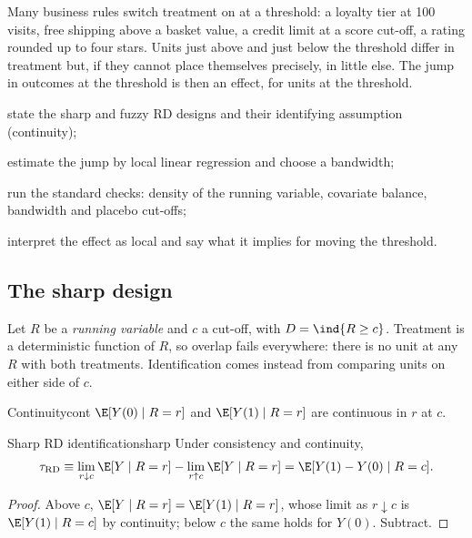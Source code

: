 \documentclass[11pt]{article}
\begin{document}

\begin{decision}
Many business rules switch treatment on at a threshold: a loyalty tier at 100 visits, free shipping above a basket value, a
credit limit at a score cut-off, a rating rounded up to four stars. Units just above and just below the threshold differ in
treatment but, if they cannot place themselves precisely, in little else. The jump in outcomes at the threshold is then an
effect, for units at the threshold.
\end{decision}

\begin{goals}
  \item state the sharp and fuzzy RD designs and their identifying assumption (continuity);
  \item estimate the jump by local linear regression and choose a bandwidth;
  \item run the standard checks: density of the running variable, covariate balance, bandwidth and placebo cut-offs;
  \item interpret the effect as local and say what it implies for moving the threshold.
\end{goals}

\sectionone

\subsection{The sharp design}

Let $R$ be a \emph{running variable} and $c$ a cut-off, with $D = \ind{R \ge c}$. Treatment is a deterministic function of $R$, so
overlap fails everywhere: there is no unit at any $R$ with both treatments. Identification comes instead from comparing units on
either side of $c$.

\begin{assum}{Continuity}{cont}
$\E[Y(0) \mid R = r]$ and $\E[Y(1) \mid R = r]$ are continuous in $r$ at $c$.
\end{assum}

\begin{prop}{Sharp RD identification}{sharp}
Under consistency and continuity,
\[
  \tau_{\text{RD}} \equiv \lim_{r \downarrow c}\E[Y \mid R = r] - \lim_{r \uparrow c}\E[Y \mid R = r] = \E[Y(1) - Y(0) \mid R = c].
\]
\end{prop}
\begin{proof}
Above $c$, $\E[Y \mid R = r] = \E[Y(1) \mid R = r]$, whose limit as $r \downarrow c$ is $\E[Y(1) \mid R = c]$ by continuity; below $c$ the same
holds for $Y(0)$. Subtract.
\end{proof}
\end{document}
